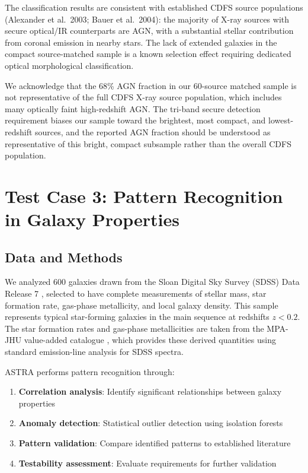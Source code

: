 \documentclass[usenatbib]{rasti}
\begin{document}
The classification results are consistent with established CDFS source populations (Alexander et al.~2003; Bauer et al.~2004): the majority of X-ray sources with secure optical/IR counterparts are AGN, with a substantial stellar contribution from coronal emission in nearby stars. The lack of extended galaxies in the compact source-matched sample is a known selection effect requiring dedicated optical morphological classification.

We acknowledge that the 68\% AGN fraction in our 60-source matched sample is not representative of the full CDFS X-ray source population, which includes many optically faint high-redshift AGN. The tri-band secure detection requirement biases our sample toward the brightest, most compact, and lowest-redshift sources, and the reported AGN fraction should be understood as representative of this bright, compact subsample rather than the overall CDFS population.

\section{Test Case 3: Pattern Recognition in Galaxy Properties}

\subsection{Data and Methods}

We analyzed 600 galaxies drawn from the Sloan Digital Sky Survey (SDSS) Data Release 7 \cite{abazajian2009}, selected to have complete measurements of stellar mass, star formation rate, gas-phase metallicity, and local galaxy density. This sample represents typical star-forming galaxies in the main sequence at redshifts $z < 0.2$. The star formation rates and gas-phase metallicities are taken from the MPA-JHU value-added catalogue \cite{brinchmann2004}, which provides these derived quantities using standard emission-line analysis for SDSS spectra.

ASTRA performs pattern recognition through:
\begin{enumerate}
\item \textbf{Correlation analysis}: Identify significant relationships between galaxy properties
\item \textbf{Anomaly detection}: Statistical outlier detection using isolation forests
\item \textbf{Pattern validation}: Compare identified patterns to established literature
\item \textbf{Testability assessment}: Evaluate requirements for further validation
\end{enumerate}
\end{document}
